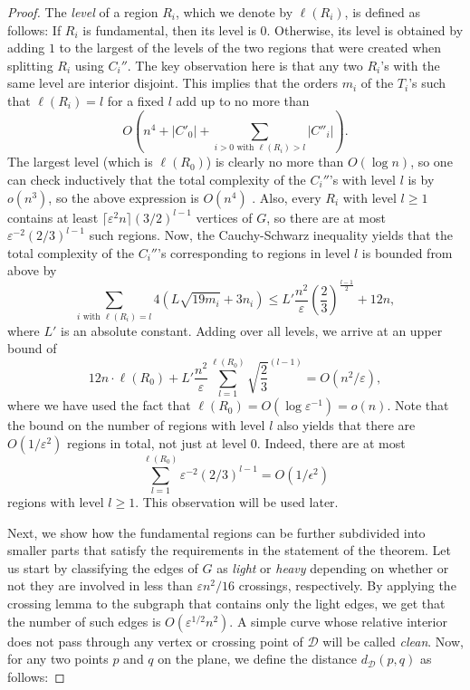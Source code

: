 \documentclass{article}
\begin{document}
\begin{proof}
    The \textit{level} of a region $R_i$, which we denote by $\ell(R_i)$, is defined as follows: If $R_i$ is fundamental, then its level is $0$. Otherwise, its level is obtained by adding $1$ to the largest of the levels of the two regions that were created when splitting $R_i$ using $C_i''$. The key observation here is that any two $R_i$'s with the same level are interior disjoint. This implies that the orders $m_i$ of the $T_i$'s such that $\ell(R_i)=l$ for a fixed $l$ add up to no more than \[O\left(n^4+|C'_0|+\sum_{i>0\text{ with } \ell(R_i)>l} |C''_i|\right).\] The largest level (which is $\ell(R_0)$) is clearly no more than $O(\log n)$, so one can check inductively that the total complexity of the $C_i''$'s with level $l$ is by $o(n^3)$, so the above expression is $O(n^4)$ . Also, every $R_i$ with level $l\geq1$ contains at least $\lceil\varepsilon^2 n\rceil(3/2)^{l-1}$ vertices of $G$, so there are at most $\varepsilon^{-2}(2/3)^{l-1}$ such regions. Now, the Cauchy-Schwarz inequality yields that the total complexity of the $C_i''$'s corresponding to regions in level $l$ is bounded from above by \[\sum_{i\text{ with } \ell(R_i)=l}4(L\sqrt{19m_i}+3n_i)\leq L'\frac{n^2}{\varepsilon}\left(\frac{2}{3}\right)^{\frac{l-1}{2}}+12n,\] where $L'$ is an absolute constant. Adding over all levels, we arrive at an upper bound of \[12n\cdot \ell(R_0)+ L'\frac{n^2}{\varepsilon}\sum_{l=1}^{\ell(R_0)}\sqrt{\frac{2}{3}}^{(l-1)}=O(n^2/\varepsilon),\] where we have used the fact that $\ell(R_0)=O(\log\varepsilon^{-1})=o(n)$. Note that the bound on the number of regions with level $l$ also yields that there are $O(1/\varepsilon^2)$ regions in total, not just at level $0$. Indeed, there are at most \[\sum_{l=1}^{\ell(R_0)}\varepsilon^{-2}(2/3)^{l-1}=O(1/\epsilon^2)\] regions with level $l\geq 1$. This observation will be used later.
    
    Next, we show how the fundamental regions can be further subdivided into smaller parts that satisfy the requirements in the statement of the theorem. Let us start by classifying the edges of $G$ as \textit{light} or \textit{heavy} depending on whether or not they are involved in less than $\varepsilon n^2/16$ crossings, respectively. By applying the crossing lemma to the subgraph that contains only the light edges, we get that the number of such edges is $O(\varepsilon^{1/2}n^2)$. A simple curve whose relative interior does not pass through any vertex or crossing point of $\mathcal{D}$ will be called \textit{clean}. Now, for any two points $p$ and $q$ on the plane, we define the distance $d_\mathcal{D}(p,q)$ as follows: 
    

\end{proof}
\end{document}
